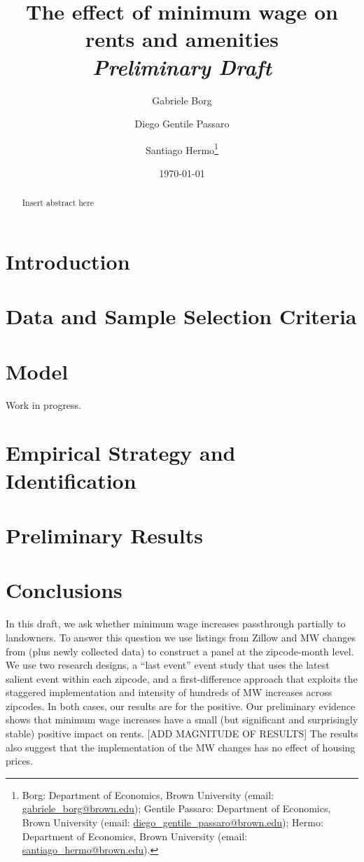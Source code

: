 \documentclass{article}
\title{The effect of minimum wage on rents and amenities \\
        \vspace{2mm} \large \textit{Preliminary Draft}}
\author{Gabriele Borg \and Diego Gentile Passaro \and Santiago Hermo\footnote{Borg: Department of Economics, Brown University (email: \url{gabriele_borg@brown.edu}); Gentile Passaro: Department of Economics, Brown University (email: \url{diego_gentile_passaro@brown.edu}); Hermo: Department of Economics, Brown University (email: \url{santiago_hermo@brown.edu}).}}
\date{\today}
\begin{document}
\maketitle

\begin{abstract}
    \noindent Insert abstract here
\end{abstract}

\vspace{5mm}

\maketitle
\onehalfspacing

\clearpage

\section{Introduction}\label{sec:intro}
    

\section{Data and Sample Selection Criteria}\label{sec:data}
    

\section{Model}\label{sec:model}

    Work in progress.

\section{Empirical Strategy and Identification}\label{sec:empirical_strategy}
    

\section{Preliminary Results}\label{sec:results}
    

\section{Conclusions}

    In this draft, we ask whether minimum wage increases passthrough partially to landowners. To answer this question we use listings from Zillow and MW changes from \textcite{vaghul2016historical} (plus newly collected data) to construct a panel at the zipcode-month level. We use two research designs, a ``last event'' event study that uses the latest salient event within each zipcode, and a first-difference approach that exploits the staggered implementation and intensity of hundreds of MW increases across zipcodes. In both cases, our results are for the positive. Our preliminary evidence shows that minimum wage increases have a small (but significant and surprisingly stable) positive impact on rents. [ADD MAGNITUDE OF RESULTS] The results also suggest that the implementation of the MW changes has no effect of housing prices.
\end{document}
